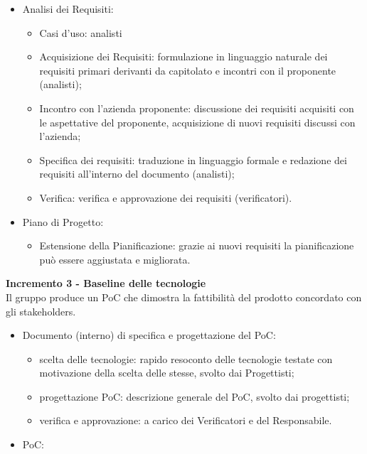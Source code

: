 {{    \begin{itemize}
        \item Analisi dei Requisiti:
            \begin{itemize}
                \item Casi d'uso: analisti
                \item Acquisizione dei Requisiti: formulazione in linguaggio naturale dei requisiti primari derivanti da capitolato e incontri con il proponente (analisti);
                \item Incontro con l'azienda proponente: discussione dei requisiti acquisiti con le aspettative del proponente, acquisizione di nuovi requisiti discussi con l'azienda;
                \item Specifica dei requisiti: traduzione in linguaggio formale e redazione dei requisiti all'interno del documento \AdR{} (analisti);
                \item Verifica: verifica e approvazione dei requisiti (verificatori).
            \end{itemize}
    \item Piano di Progetto: 
        \begin{itemize}
            \item Estensione della Pianificazione: grazie ai nuovi requisiti la pianificazione può essere aggiustata e migliorata.
        \end{itemize} 
    \end{itemize}
    \textbf{Incremento 3 - Baseline delle tecnologie} \\
    Il gruppo produce un PoC che dimostra la fattibilità del prodotto concordato con gli stakeholders. \\
    \begin{itemize}
        \item Documento (interno) di specifica e progettazione del PoC:
            \begin{itemize}
                \item scelta delle tecnologie: rapido resoconto delle tecnologie testate con motivazione della scelta delle stesse, svolto dai Progettisti;
                \item progettazione PoC: descrizione generale del PoC, svolto dai progettisti;
                \item verifica e approvazione: a carico dei Verificatori e del Responsabile.
            \end{itemize}
        \item PoC: 

\end{itemize}}}
